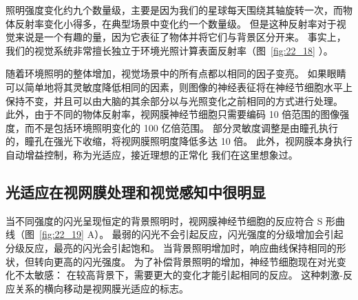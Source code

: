 照明强度变化约九个数量级，主要是因为我们的星球每天围绕其轴旋转一次，而物体反射率变化小得多，在典型场景中变化约一个数量级。
但是这种反射率对于视觉来说是一个有趣的量，因为它表征了物体并将它们与背景区分开来。
事实上，我们的视觉系统非常擅长独立于环境光照计算表面反射率（图~\ref{fig:22_18} ）。


随着环境照明的整体增加，视觉场景中的所有点都以相同的因子变亮。
如果眼睛可以简单地将其灵敏度降低相同的因素，则图像的神经表征将在神经节细胞水平上保持不变，并且可以由大脑的其余部分以与光照变化之前相同的方式进行处理。 
此外，由于不同的物体反射率，视网膜神经节细胞只需要编码 10 倍范围的图像强度，而不是包括环境照明变化的 100 亿倍范围。
部分灵敏度调整是由瞳孔执行的，瞳孔在强光下收缩，将视网膜照明度降低多达 10 倍。
此外，视网膜本身执行自动增益控制，称为光适应，接近理想的正常化 我们在这里想象过。



\subsection{光适应在视网膜处理和视觉感知中很明显}

当不同强度的闪光呈现恒定的背景照明时，视网膜神经节细胞的反应符合 S 形曲线（图~\ref{fig:22_19} A）。
最弱的闪光不会引起反应，闪光强度的分级增加会引起分级反应，最亮的闪光会引起饱和。
当背景照明增加时，响应曲线保持相同的形状，但转向更高的闪光强度。
为了补偿背景照明的增加，神经节细胞现在对光变化不太敏感：
在较高背景下，需要更大的变化才能引起相同的反应。
这种刺激-反应关系的横向移动是视网膜光适应的标志。


